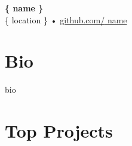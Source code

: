 \documentclass[11pt,a4paper]{article}
\begin{document}
\begin{center}
    {\LARGE \textbf{\{{ name }\}}}\\
    \vspace{0.5em}
    {\{{ location \}} • \href{https://github.com/{{ name }}}{github.com/{{ name }}}}
\end{center}

\section*{Bio}
{{ bio }}

\section*{Top Projects}
\end{document}
